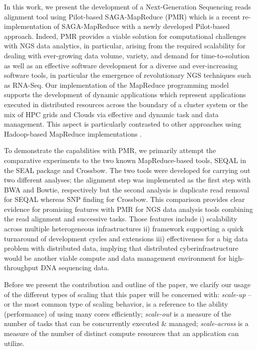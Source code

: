 \documentclass{sig-alternate}
\begin{document}
In this work, we present the development of a Next-Generation Sequencing reads alignment tool using Pilot-based SAGA-MapReduce (PMR) which is a recent re-implementation of SAGA-MapReduce with a newly developed Pilot-based approach\cite{Sehgal2011590,pmr2012}.  Indeed, PMR provides a viable solution for computational challenges with NGS data analytics, in particular, arising from the required scalability for dealing with ever-growing data volume, variety, and demand for time-to-solution as well as an effective software development for a diverse and ever-increasing software tools, in particular the emergence of revolutionary NGS techniques such as RNA-Seq.  Our implementation of the MapReduce programming model supports the development of dynamic applications which represent applications executed in distributed resources across the boundary of a cluster system or the mix of HPC grids and Clouds via effective and dynamic task and data management.  This aspect is particularly contrasted to other approaches using Hadoop-based MapReduce implementations \cite{cloudburst,langmead2009,seal2011,langmead2010}.  

To demonstrate the capabilities with PMR, we primarily attempt the comparative experiments to the two known MapReduce-based tools, SEQAL in the SEAL package and Crossbow\cite{seal2011,lanmead2010}.  The two tools were developed for carrying out two different analyses; the alignment step was implemented as the first step with BWA and Bowtie, respectively but the second analysis is duplicate read removal for SEQAL whereas SNP finding for Crossbow.  This comparison provides clear evidence for promising features with PMR for NGS data analysis tools combining the read alignment and successive tasks.  Those features include i) scalability across multiple heterogeneous infrastructures ii) framework supporting a quick turnaround of development cycles and extensions iii) effectiveness for a big data problem with distributed data, implying that distributed cyberinfrastructure would be another viable compute and data management environment for high-throughput DNA sequencing data.  

Before we present the contribution and outline of the paper, we
clarify our usage of the different types of scaling that this paper
will be concerned with: {\it scale-up} -- or the most common type of
scaling behavior, is a reference to the ability (performance) of using
many cores efficiently; {\it scale-out} is a measure of the number of
tasks that can be concurrently executed \& managed; {\it scale-across}
is a measure of the number of distinct compute resources that an
application can utilize.
\end{document}
